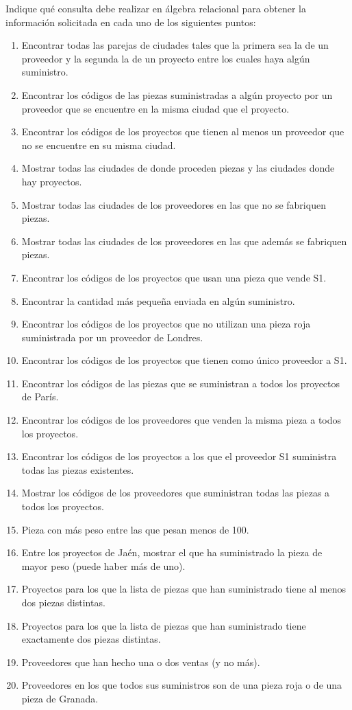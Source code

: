 \begin{ejercicio}
    Indique qué consulta debe realizar en álgebra relacional para obtener la información solicitada en cada uno de los siguientes puntos:
    \begin{enumerate}
        \item Encontrar todas las parejas de ciudades tales que la primera sea la de un proveedor y la segunda la de un proyecto entre los cuales haya algún suministro.
        \item Encontrar los códigos de las piezas suministradas a algún proyecto por un proveedor que se encuentre en la misma ciudad que el proyecto.
        \item Encontrar los códigos de los proyectos que tienen al menos un proveedor que no se encuentre en su misma ciudad.
        \item Mostrar todas las ciudades de donde proceden piezas y las ciudades donde hay proyectos.
        \item Mostrar todas las ciudades de los proveedores en las que no se fabriquen piezas.
        \item Mostrar todas las ciudades de los proveedores en las que además se fabriquen piezas.
        \item Encontrar los códigos de los proyectos que usan una pieza que vende S1.
        \item Encontrar la cantidad más pequeña enviada en algún suministro.
        \item Encontrar los códigos de los proyectos que no utilizan una pieza roja suministrada por un proveedor de Londres.
        \item Encontrar los códigos de los proyectos que tienen como único proveedor a S1.
        \item Encontrar los códigos de las piezas que se suministran a todos los proyectos de París.
        \item Encontrar los códigos de los proveedores que venden la misma pieza a todos los proyectos.
        \item Encontrar los códigos de los proyectos a los que el proveedor S1 suministra todas las piezas existentes.
        \item Mostrar los códigos de los proveedores que suministran todas las piezas a todos los proyectos.
        \item Pieza con más peso entre las que pesan menos de 100.
        \item Entre los proyectos de Jaén, mostrar el que ha suministrado la pieza de mayor peso (puede haber más de uno).
        \item Proyectos para los que la lista de piezas que han suministrado tiene al menos dos piezas distintas.
        \item Proyectos para los que la lista de piezas que han suministrado tiene exactamente dos piezas distintas.
        \item Proveedores que han hecho una o dos ventas (y no más).
        \item Proveedores en los que todos sus suministros son de una pieza roja o de una pieza de Granada.
    \end{enumerate}
    
\end{ejercicio}